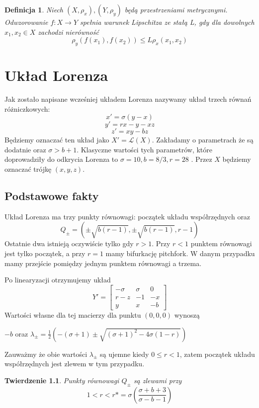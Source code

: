 \documentclass[12pt]{report}
\newtheorem{theorem}{Twierdzenie}
\newtheorem{definition}{Definicja}
\begin{document}
	\begin{definition}
		Niech $(X, \rho_x), (Y, \rho_y)$ będą przestrzeniami metrycznymi. Odwzorowanie $f: X \to Y$ spełnia warunek Lipschitza ze stałą L, gdy dla dowolnych $x_1, x_2 \in X$ zachodzi nierówność
		\[ \rho_y(f(x_1), f(x_2)) \le L \rho_x(x_1, x_2) \]
	\end{definition}

\chapter{Układ Lorenza}
	\par Jak zostało napisane wcześniej układem Lorenza nazywamy układ trzech równań różniczkowych:
		\[ x' = \sigma (y - x) \]
		\[ y' = rx - y - xz \]
		\[ z' = xy - bz \]
	Będziemy oznaczać ten układ jako $X' = \mathcal{L}(X)$. Zakładamy o parametrach że są dodatnie oraz $\sigma > b + 1$. Klasyczne wartości tych parametrów, które doprowadziły do odkrycia Lorenza to $\sigma = 10, b = 8/3, r = 28$ \cite{Lorenz}. Przez $X$ będziemy oznaczać trójkę $(x, y, z)$.

	\section{Podstawowe fakty}
	\par Układ Lorenza ma trzy punkty równowagi: początek układu współrzędnych oraz
		\[ Q_{\pm} = (\pm \sqrt{b(r - 1)}, \pm \sqrt{b(r - 1)}, r - 1) \]
	Ostatnie dwa istnieją oczywiście tylko gdy $r > 1$. Przy $r < 1$ punktem równowagi jest tylko początek, a przy $r = 1$ mamy bifurkację pitchfork. W danym przypadku mamy przejście pomiędzy jednym punktem równowagi a trzema.
	
	\par Po linearyzacji otrzymujemy układ
		\[ Y' = \begin{bmatrix}
					-\sigma & \sigma & 0 \\
					r-z & -1 & -x \\
					y & x & -b
				\end{bmatrix}
		\]
	Wartości własne dla tej macierzy dla punktu $(0, 0, 0)$ wynoszą
	\begin{center}
		$-b$ oraz $\lambda_{\pm} = \frac{1}{2} (-(\sigma + 1) \pm \sqrt{(\sigma + 1)^2 - 4\sigma (1 - r)})$
	\end{center}
	Zauważmy że obie wartości $\lambda_{\pm}$ są ujemne kiedy $0 \le r < 1$, zatem początek układu współrzędnych jest zlewem w tym przypadku.
	\begin{theorem}
		Punkty równowagi $Q_{\pm}$ są zlewami przy
		\[ 1 < r < r* = \sigma (\frac{\sigma + b + 3}{\sigma - b - 1}) \]
	\end{theorem}
	
\end{document}
